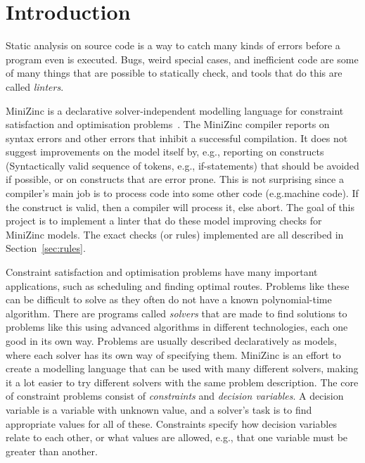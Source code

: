\documentclass[a4paper,12pt]{article}
\newcommand{\leblanc}{\clearpage\thispagestyle{empty}\null\clearpage}
\begin{document}
\leblanc

\tableofcontents

\cleardoublepage

\mainmatter

\section{Introduction}\label{sec:introduktion}
Static analysis on source code is a way to catch many kinds of errors before
a program even is executed.
Bugs, weird special cases, and inefficient code are some of many things that are possible
to statically check, and tools that do this are called \emph{linters}.

MiniZinc is a declarative solver-independent modelling language for constraint
satisfaction and optimisation problems~\cite{MiniZinc}. The MiniZinc compiler reports on
syntax errors and other errors that inhibit a successful compilation. It does not suggest
improvements on the model itself by, e.g.\@, reporting on constructs (Syntactically valid
sequence of tokens, e.g.\@, if-statements) that should be avoided if possible, or on
constructs that are error prone. This is not surprising since a compiler's main job is to
process code into some other code (e.g.\@ machine code). If the construct is valid, then a compiler will
process it, else abort. The goal of this project is to implement a linter that do these model
improving checks for MiniZinc models. The exact checks (or rules) implemented are all
described in Section~\ref{sec:rules}.

Constraint satisfaction and optimisation problems have many important applications, such
as scheduling and finding optimal routes. Problems like these can be difficult to solve as
they often do not have a known polynomial-time algorithm. There are programs called
\emph{solvers} that are made to find solutions to problems like this using advanced
algorithms in different technologies, each one good in its own way. Problems are usually
described declaratively as models, where each solver has its own way of specifying them.
MiniZinc is an effort to create a modelling language that can be used with many different
solvers, making it a lot easier to try different solvers with the same problem
description. The core of constraint problems consist of \emph{constraints} and
\emph{decision variables}. A decision variable is a variable with unknown value, and a
solver's task is to find appropriate values for all of these. Constraints specify how
decision variables relate to each other, or what values are allowed, e.g., that one
variable must be greater than another.
\end{document}
